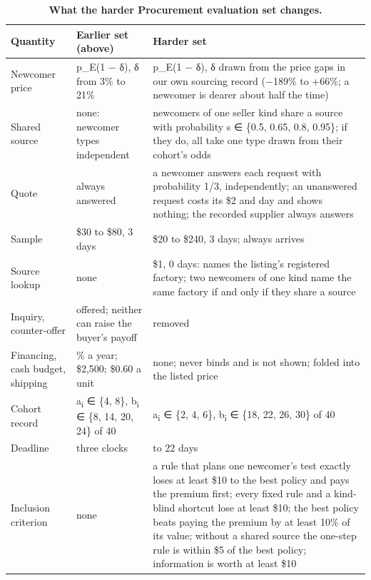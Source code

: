\renewcommand{\thetable}{A.6}
\begin{longtable}[]{@{}
  >{\raggedright\arraybackslash}p{}
  >{\raggedright\arraybackslash}p{}
  >{\raggedright\arraybackslash}p{}@{}}
\caption{\textbf{What the harder Procurement evaluation set changes.}}\label{tab:A.6}\tabularnewline
\toprule\noalign{}
\begin{minipage}[b]{\linewidth}\raggedright
Quantity
\end{minipage} & \begin{minipage}[b]{\linewidth}\raggedright
Earlier set (above)
\end{minipage} & \begin{minipage}[b]{\linewidth}\raggedright
Harder set
\end{minipage} \\
\midrule\noalign{}
\endhead
\bottomrule\noalign{}
\endlastfoot
Newcomer price & p\_E(1 − δ), δ from 3\% to 21\% & p\_E(1 − δ), δ drawn from the price gaps in our own sourcing record (−189\% to +66\%; a newcomer is dearer about half the time) \\
Shared source & none: newcomer types independent & newcomers of one seller kind share a source with probability s ∈ \{0.5, 0.65, 0.8, 0.95\}; if they do, all take one type drawn from their cohort's odds \\
Quote & always answered & a newcomer answers each request with probability 1/3, independently; an unanswered request costs its \$2 and day and shows nothing; the recorded supplier always answers \\
Sample & \$30 to \$80, 3 days & \$20 to \$240, 3 days; always arrives \\
Source lookup & none & \$1, 0 days: names the listing's registered factory; two newcomers of one kind name the same factory if and only if they share a source \\
Inquiry, counter-offer & offered; neither can raise the buyer's payoff & removed \\
Financing, cash budget, shipping & 12\% a year; \$2,500; \$0.60 a unit & none; never binds and is not shown; folded into the listed price \\
Cohort record & a\textsubscript{i} ∈ \{4, 8\}, b\textsubscript{i} ∈ \{8, 14, 20, 24\} of 40 & a\textsubscript{i} ∈ \{2, 4, 6\}, b\textsubscript{i} ∈ \{18, 22, 26, 30\} of 40 \\
Deadline & three clocks & 14 to 22 days \\
Inclusion criterion & none & a rule that plans one newcomer's test exactly loses at least \$10 to the best policy and pays the premium first; every fixed rule and a kind-blind shortcut lose at least \$10; the best policy beats paying the premium by at least 10\% of its value; without a shared source the one-step rule is within \$5 of the best policy; information is worth at least \$10 \\
\end{longtable}

